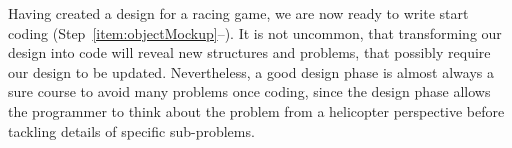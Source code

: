 Having created a design for a racing game, we are now ready to write start coding (Step~\ref{item:objectMockup}--). It is not uncommon, that transforming our design into code will reveal new structures and problems, that possibly require our design to be updated. Nevertheless, a good design phase is almost always a sure course to avoid many problems once coding, since the design phase allows the programmer to think about the problem from a helicopter perspective before tackling details of specific sub-problems.


